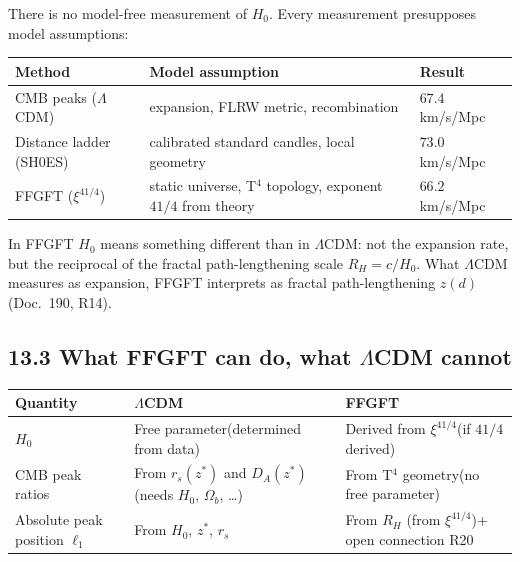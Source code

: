 There is no model-free measurement of $H_0$.
Every measurement presupposes model assumptions:

\begin{center}
\begin{tabular}{p{3.5cm}p{5.5cm}p{3cm}}
\toprule
\textbf{Method} & \textbf{Model assumption} & \textbf{Result} \\
\midrule
CMB peaks ($\Lambda$CDM) &
  expansion, FLRW metric, recombination &
  $67{.}4$ km/s/Mpc \\
\addlinespace
Distance ladder (SH0ES) &
  calibrated standard candles, local geometry &
  $73{.}0$ km/s/Mpc \\
\addlinespace
FFGFT ($\xi^{41/4}$) &
  static universe, T$^4$ topology,\newline
  exponent $41/4$ from theory &
  $66{.}2$ km/s/Mpc \\
\bottomrule
\end{tabular}
\end{center}

In FFGFT $H_0$ means something different than in $\Lambda$CDM:
not the expansion rate, but the reciprocal of the
fractal path-lengthening scale $R_H = c/H_0$.
What $\Lambda$CDM measures as expansion, FFGFT interprets
as fractal path-lengthening $z(d)$ (Doc.~190, R14).

\subsection*{13.3 What FFGFT can do, what $\Lambda$CDM cannot}

\begin{center}
\begin{tabular}{p{5cm}p{4.5cm}p{4.5cm}}
\toprule
\textbf{Quantity} & \textbf{$\Lambda$CDM} & \textbf{FFGFT} \\
\midrule
$H_0$ &
  Free parameter\newline (determined from data) &
  Derived from $\xi^{41/4}$\newline (if $41/4$ derived) \\
\addlinespace
CMB peak ratios &
  From $r_s(z^*)$ and $D_A(z^*)$\newline (needs $H_0$, $\Omega_b$, \ldots) &
  From T$^4$ geometry\newline (no free parameter) \\
\addlinespace
Absolute peak position $\ell_1$ &
  From $H_0$, $z^*$, $r_s$ &
  From $R_H$ (from $\xi^{41/4}$)\newline + open connection R20 \\
\bottomrule
\end{tabular}
\end{center}

